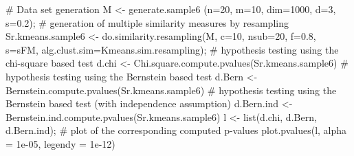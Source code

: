\documentclass{article}
\begin{document}
\begin{SeeAlso}\relax
{}
\end{SeeAlso}
\begin{Examples}
\begin{ExampleCode}
# Data set generation
M <- generate.sample6 (n=20, m=10, dim=1000, d=3, s=0.2);
# generation of multiple similarity measures by resampling
Sr.kmeans.sample6 <- do.similarity.resampling(M, c=10, nsub=20, f=0.8, s=sFM, 
                                      alg.clust.sim=Kmeans.sim.resampling); 
# hypothesis testing using the chi-square based test
d.chi <- Chi.square.compute.pvalues(Sr.kmeans.sample6)
# hypothesis testing using the Bernstein based test
d.Bern <- Bernstein.compute.pvalues(Sr.kmeans.sample6)
# hypothesis testing using the Bernstein based test (with independence assumption)
d.Bern.ind <- Bernstein.ind.compute.pvalues(Sr.kmeans.sample6)
l <- list(d.chi, d.Bern, d.Bern.ind);
# plot of the corresponding computed p-values
plot.pvalues(l, alpha = 1e-05, legendy = 1e-12)
\end{ExampleCode}
\end{Examples}
\end{document}
